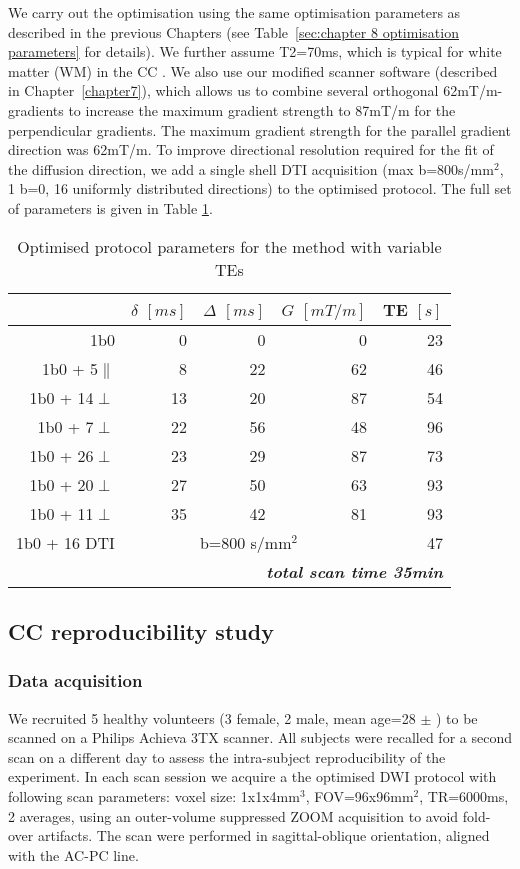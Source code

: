 We carry out the optimisation using the same optimisation parameters as described in the previous Chapters (see Table~\ref{sec:chapter 8 optimisation parameters} for details). We further assume T2=70ms, which is typical for white matter (WM) in the CC \citep{}. We also use our modified scanner software (described in Chapter~\ref{chapter7}), which allows us to combine several orthogonal 62mT/m-gradients to increase the maximum gradient strength to 87mT/m for the perpendicular gradients. The maximum gradient strength for the parallel gradient direction was 62mT/m. To improve directional resolution required for the fit of the diffusion direction, we add a single shell DTI acquisition (max b=800s/mm$^2$, 1 b=0, 16 uniformly distributed directions) to the optimised protocol. The full set of parameters is given in Table \ref{tab:chap9 protocol table}.

\begin{table}[htbp]
  \centering
  \caption{Optimised protocol parameters for the \SFasym{} method with variable TEs}
    \begin{tabular}{rrrrr}
    \toprule
    	  & $\delta$ $[ms]$   & $\Delta$ $[ms]$ & $G$ $[mT/m]$ & TE $[s]$\\
    \midrule
    {1b0} & {0} & {0} & {0} & {23} \\
    {1b0 + 5$\parallel$} & {8} & {22} & {62} & {46} \\
    {1b0 + 14$\perp$} & {13} & {20} & {87} & {54} \\
    {1b0 + 7$\perp$} & {22} & {56} & {48} & {96} \\
    {1b0 + 26$\perp$} & {23} & {29} & {87} & {73} \\
    {1b0 + 20$\perp$} & {27} & {50} & {63} & {93} \\
    {1b0 + 11$\perp$} & {35} & {42} & {81} & {93} \\
    {1b0 + 16 DTI} & \multicolumn{3}{c}{{b=800 s/mm$^2$}} & {47} \\
    \midrule
    \multicolumn{5}{r}{\textit{\textbf{total scan time 35min}}} \\
    \bottomrule
    \end{tabular}%
  \label{tab:chap9 protocol table}%
\end{table}%

\subsection{CC reproducibility study}
\subsubsection*{Data acquisition}
We recruited 5 healthy volunteers (3 female, 2 male, mean age=28 $\pm$ ) to be scanned on a Philips Achieva 3TX scanner. All subjects were recalled for a second scan on a different day to assess the intra-subject reproducibility of the experiment. In each scan session we acquire a the optimised \SF{} DWI protocol with following scan parameters: voxel size: 1x1x4mm$^3$, FOV=96x96mm$^2$, TR=6000ms, 2 averages, using an outer-volume suppressed ZOOM acquisition \citep{Wilm:2007} to avoid fold-over artifacts. The scan were performed in sagittal-oblique orientation, aligned with the AC-PC line.
